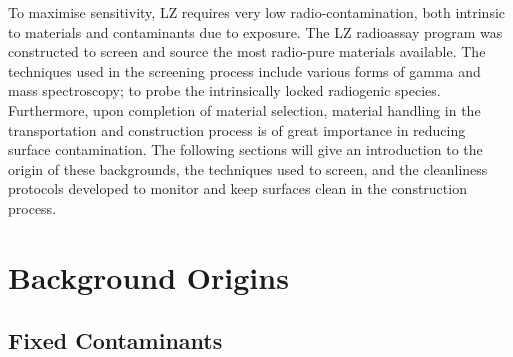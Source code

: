 To maximise sensitivity, LZ requires very low radio-contamination, both intrinsic to materials and contaminants due to exposure. The LZ radioassay program was constructed to screen and source the most radio-pure materials available. The techniques used in the screening process include various forms of gamma and mass spectroscopy; to probe the intrinsically locked radiogenic species. Furthermore, upon completion of material selection, material handling in the transportation and construction process is of great importance in reducing surface contamination. The following sections will give an introduction to the origin of these backgrounds, the techniques used to screen, and the cleanliness protocols developed to monitor and keep surfaces clean in the construction process. 

\section{Background Origins}
\label{sec:background_origins}

\subsection{Fixed Contaminants}
\label{subsec:fixed_contaminants}

